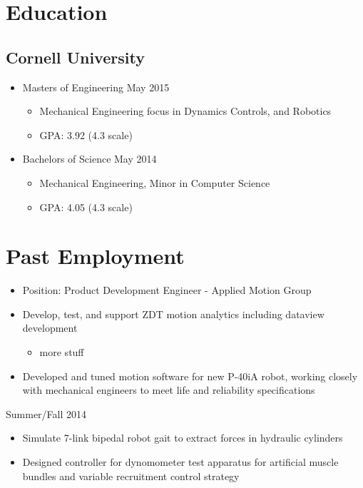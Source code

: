 \documentclass{BradyResume}
\begin{document}
\maketitle
\vspace*{-1em}
\section*{Education}
\subsection*{Cornell University}
\begin{itemize}
\item Masters of Engineering 
\dotfill May 2015
  \begin{itemize}
      \item Mechanical Engineering focus in Dynamics Controls, and Robotics
      \item GPA: 3.92 (4.3 scale)
  \end{itemize}
\item Bachelors of Science 
\dotfill May 2014
  \begin{itemize}
  \item Mechanical Engineering, Minor in Computer Science
  \item GPA: 4.05 (4.3 scale)
  \end{itemize}
\end{itemize}

\section*{Past Employment}
\begin{itemize}
  \item Position: Product Development Engineer - Applied Motion Group
  \item Develop, test, and support ZDT motion analytics including dataview development
  \begin{itemize}
    \item more stuff
  \end{itemize}
  \item Developed and tuned motion software for new P-40iA robot, working closely with mechanical engineers to meet life and reliability specifications
\end{itemize}
%
           {Summer/Fall 2014}
\begin{itemize}
  \item Simulate 7-link bipedal robot gait to extract forces in hydraulic cylinders
  \item Designed controller for dynomometer test apparatus for artificial muscle bundles and variable recruitment control strategy
\end{itemize}
\end{document}
